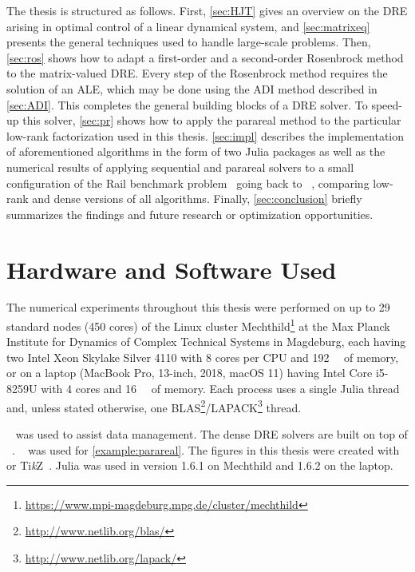 The thesis is structured as follows.
First, \autoref{sec:HJT} gives an overview on the \ac{DRE} arising in optimal control of a linear dynamical system,
and \autoref{sec:matrixeq} presents the general techniques used to handle large-scale problems.
Then, \autoref{sec:ros} shows how to adapt a first-order and a second-order Rosenbrock method to the matrix-valued \ac{DRE}.
Every step of the Rosenbrock method requires the solution of an \ac{ALE},
which may be done using \eg the \ac{ADI} method described in \autoref{sec:ADI}.
This completes the general building blocks of a \ac{DRE} solver.
To speed-up this solver,
\autoref{sec:pr} shows how to apply the parareal method to the particular low-rank factorization used in this thesis.
\autoref{sec:impl} describes the implementation of aforementioned algorithms in the form of two Julia packages
as well as the numerical results of applying sequential and parareal solvers to
a small configuration of the Rail benchmark problem~\cite{morwiki_steel} going back to \citeauthor{Benner2005}~\cite{Benner2005},
comparing low-rank and dense versions of all algorithms.
Finally, \autoref{sec:conclusion} briefly summarizes the findings and future research or optimization opportunities.

\section*{Hardware and Software Used}

The numerical experiments throughout this thesis were performed
on up to 29 standard nodes (450 cores) of the Linux cluster Mechthild\footnote{\url{https://www.mpi-magdeburg.mpg.de/cluster/mechthild}}
at the Max Planck Institute for Dynamics of Complex Technical Systems in Magdeburg,
each having
two Intel Xeon Skylake Silver 4110 with 8 cores per CPU
and \SI{192}{\giga\byte} of memory,
or on a laptop (MacBook Pro, 13-inch, 2018, macOS 11) having
Intel Core i5-8259U with 4 cores and \SI{16}{\giga\byte} of memory.
Each process uses a single Julia thread and,
unless stated otherwise, one BLAS\footnote{%
  \url{http://www.netlib.org/blas/}
}/LAPACK\footnote{%
  \url{http://www.netlib.org/lapack/}
} thread.

~\cite{DrWatson} was used to assist data management.
The dense \ac{DRE} solvers are built on top of ~\cite{MatrixEquations}.
~\cite{DifferentialEquations} was used for \autoref{example:parareal}.
The figures in this thesis were created with
~\cite{Makie} or Ti\emph{k}Z~\cite{TikZ}.
Julia was used in version 1.6.1 on Mechthild and 1.6.2 on the laptop.

